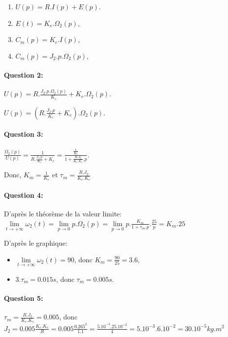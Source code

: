 \begin{enumerate}
 \item $U(p)=R.I(p)+E(p)$.
 \item $E(t)=K_e.\Omega_2(p)$,
 \item $C_m(p)=K_c.I(p)$,
 \item $C_m(p)=J_2.p.\Omega_2(p)$,
\end{enumerate}

\paragraph{Question 2:}

$U(p)=R.\frac{J_2.p.\Omega_2(p)}{K_c}+K_e.\Omega_2(p)$.

$U(p)=\left(R.\frac{J_2.p}{K_c}+K_e\right).\Omega_2(p)$.

\paragraph{Question 3:}

$\frac{\Omega_2(p)}{U(p)}=\frac{1}{R.\frac{J_2.p}{K_c}+K_e}=\frac{\frac{1}{K_e}}{1+\frac{R.J_2}{K_c.K_e}.p}$.

Donc, $K_m=\frac{1}{K_e}$ et $\tau_m=\frac{R.J_2}{K_c.K_e}$


\paragraph{Question 4:}

D'après le théorème de la valeur limite: \\
$\lim\limits_{t\rightarrow +\infty} \omega_2(t)=\lim\limits_{p\rightarrow 0} p.\Omega_2(p)=\lim\limits _{p\rightarrow 0} p.\frac{K_m}{1+\tau_m.p}.\frac{25}{p}=K_m.25$

D'après le graphique: 
\begin{itemize}
 \item $\lim\limits_{t\rightarrow +\infty} \omega_2(t)=90$, donc $K_m=\frac{90}{25}=3.6$,
 \item $3.\tau_m=0.015s$, donc $\tau_m=0.005s$.
\end{itemize}


\paragraph{Question 5:}

$\tau_m=\frac{R.J_2}{K_c.K_e}=0.005$, donc $J_2=0.005\frac{K_c.K_e}{R}=0.005\frac{0.265^2}{1.1}=\frac{5.10^{-3}.25.10^{-2}}{4}=5.10^{-3}.6.10^{-2}=30.10^{-5}kg.m^2$ 

